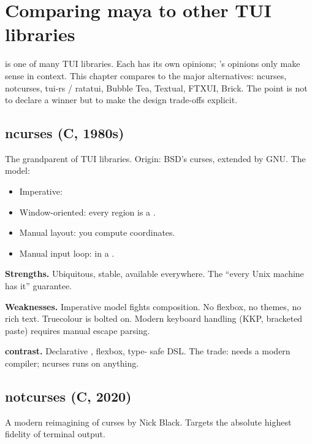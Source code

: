 \chapter{Comparing maya to other TUI libraries}
\label{ch:comparison}

\begin{aside}
\maya{} is one of many TUI libraries. Each has its own
opinions; \maya{}'s opinions only make sense in context. This
chapter compares \maya{} to the major alternatives: ncurses,
notcurses, tui-rs / ratatui, Bubble Tea, Textual, FTXUI, Brick.
The point is not to declare a winner but to make the design
trade-offs explicit.
\end{aside}

\section{ncurses (C, 1980s)}

The grandparent of TUI libraries. Origin: BSD's curses, extended
by GNU. The model:

\begin{itemize}[leftmargin=*]
  \item Imperative: 
  \item Window-oriented: every region is a .
  \item Manual layout: you compute coordinates.
  \item Manual input loop:  in a .
\end{itemize}

\textbf{Strengths.} Ubiquitous, stable, available everywhere. The
``every Unix machine has it'' guarantee.

\textbf{Weaknesses.} Imperative model fights composition. No
flexbox, no themes, no rich text. Truecolour is bolted on. Modern
keyboard handling (KKP, bracketed paste) requires manual escape
parsing.

\textbf{\maya{} contrast.} Declarative , flexbox, type-
safe DSL. The trade: \maya{} needs a modern compiler; ncurses
runs on anything.

\section{notcurses (C, 2020)}

A modern reimagining of curses by Nick Black. Targets the
absolute highest fidelity of terminal output.

